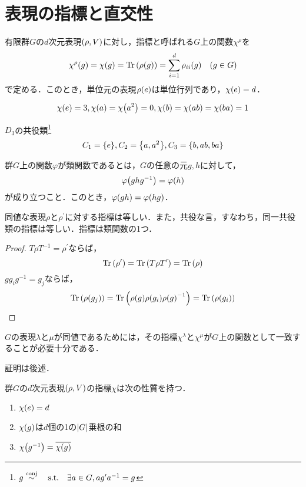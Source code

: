 \documentclass[main]{subfiles}
\begin{document}
\section{表現の指標と直交性}
	\begin{dfn}[指標(character)]
		有限群$G$の$d$次元表現$\qty(\rho,V)$に対し，指標と呼ばれる$G$上の関数$\chi^\rho$を
		\[\chi^\rho\qty(g)=\chi\qty(g)=\Trace\qty(\rho\qty(g))=\sum_{i=1}^d\rho_{ii}\qty(g)\quad\qty(g\in G)\]
		で定める．このとき，単位元の表現$\rho\qty(e)$は単位行列であり，$\chi\qty(e)=d$．
	\end{dfn}
	\begin{ex}
		\[\chi\qty(e)=3,\chi\qty(a)=\chi\qty(a^2)=0,\chi\qty(b)=\chi\qty(ab)=\chi\qty(ba)=1\]
	\end{ex}
	\begin{note*}
		$D_3$の共役類\footnote{$g\stackrel{\text{conj}}{\sim}\text{\quad s.t.\quad}\exists a\in G,ag^\prime a^{-1}=g$}
		\[C_1=\qty{e},C_2=\qty{a,a^2},C_3=\qty{b,ab,ba}\]
	\end{note*}
	\begin{dfn}[類関数]
		群$G$上の関数$\varphi$が類関数であるとは，$G$の任意の元$g,h$に対して，
		\[\varphi\qty(ghg^{-1})=\varphi\qty(h)\]
		が成り立つこと．このとき，$\varphi\qty(gh)=\varphi\qty(hg)$．
	\end{dfn}
	\begin{cor}
		同値な表現$\rho$と$\rho^\prime$に対する指標は等しい．また，共役な言，すなわち，同一共役類の指標は等しい．指標は類関数の1つ．
	\end{cor}
	\begin{proof}
		$T\rho T^{-1}=\rho^\prime$ならば，
		\[\Tr\qty(\rho^\prime)=\Tr\qty(T\rho T^\prime)=\Tr\qty(\rho)\]
		$gg_ig^{-1}=g_j$ならば，
		\[\Tr\qty(\rho\qty(g_j))=\Tr\qty(\rho\qty(g)\rho\qty(g_i)\rho\qty(g)^{-1})=\Tr\qty(\rho\qty(g_i))\]
	\end{proof}
	\begin{thm}
		$G$の表現$\lambda$と$\mu$が同値であるためには，その指標$\chi^\lambda$と$\chi^\mu$が$G$上の関数として一致することが必要十分である．
	\end{thm}
	証明は後述．
	\begin{cor}
		群$G$の$d$次元表現$\qty(\rho,V)$の指標$\chi$は次の性質を持つ．
		\begin{enumerate}
			\item $\chi\qty(e)=d$
			\item $\chi\qty(g)$は$d$個の1の$\qty|G|$乗根の和
			\item $\chi\qty(g^{-1})=\overline{\chi\qty(g)}$
		\end{enumerate}
	\end{cor}
\end{document}
